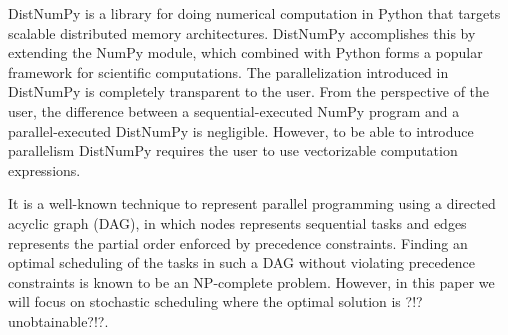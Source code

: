 \documentclass[preprint]{../PGAS10/sigplanconf}
\begin{document}
DistNumPy\cite{kristensen10_dnumpy} is a library for doing numerical computation in Python that targets scalable distributed memory architectures. DistNumPy accomplishes this by extending the NumPy module\cite{numpy}, which combined with Python forms a popular framework for scientific computations. The parallelization introduced in DistNumPy is completely transparent to the user. From the perspective of the user, the difference between a sequential-executed NumPy program and a parallel-executed DistNumPy is negligible. However, to be able to introduce parallelism DistNumPy requires the user to use vectorizable computation expressions. 

It is a well-known technique to represent parallel programming using a directed acyclic graph (DAG), in which nodes represents sequential tasks and edges represents the partial order enforced by precedence constraints. Finding an optimal scheduling of the tasks in such a DAG without violating precedence constraints is known to be an NP-complete problem\cite{Garey1979}. However, in this paper we will focus on stochastic scheduling where the optimal solution is ?!?unobtainable?!?.

\cite{Buttari09}

\cite{Song09}
\end{document}
